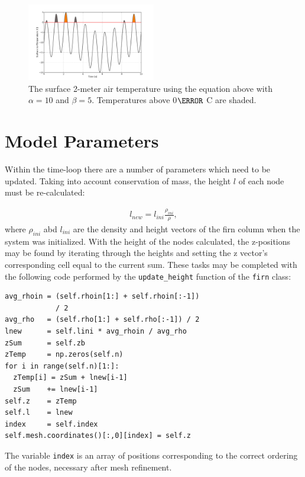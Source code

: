 \documentclass{article}%
\begin{document}
\begin{figure}[H]
  \centering
    \includegraphics[width=0.50\textwidth]{images/surfaceTemp.png}
	\caption{\footnotesize The surface 2-meter air temperature using the equation above with $\alpha = 10$ and $\beta = 5$.  Temperatures above 0$\degree$ C are shaded.}
\end{figure}



\section{Model Parameters}

Within the time-loop there are a number of parameters which need to be updated.  Taking into account conservation of mass, the height $l$ of each node must be re-calculated:\par
\begin{align*}
  l_{new} = l_{ini} \frac{\rho_{ini}}{\rho},
\end{align*}
where $\rho_{ini}$ abd $l_{ini}$ are the density and height vectors of the firn column when the system was initialized.  With the height of the nodes calculated, the z-positions may be found by iterating through the heights and setting the z vector's corresponding cell equal to the current sum.  These tasks may be completed with the following code performed by the \texttt{update\_height} function of the \texttt{firn} class:\par
\footnotesize
\begin{verbatim}
avg_rhoin = (self.rhoin[1:] + self.rhoin[:-1])
            / 2
avg_rho   = (self.rho[1:] + self.rho[:-1]) / 2
lnew      = self.lini * avg_rhoin / avg_rho
zSum      = self.zb
zTemp     = np.zeros(self.n)
for i in range(self.n)[1:]:
  zTemp[i] = zSum + lnew[i-1]
  zSum    += lnew[i-1]
self.z    = zTemp
self.l    = lnew
index     = self.index
self.mesh.coordinates()[:,0][index] = self.z
\end{verbatim}
\normalsize
The variable \texttt{index} is an array of positions corresponding to the correct ordering of the nodes, necessary after mesh refinement.  
\end{document}
